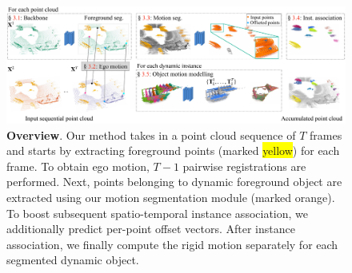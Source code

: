 \begin{figure}[t!]
     \centering
        \includegraphics[width=1.0\columnwidth]{figs/figure/overview.pdf}
        \caption{\textbf{Overview}. Our method takes in a point cloud sequence of $T$ frames and starts by extracting foreground points (marked {\setlength{\fboxsep}{0pt}\colorbox{yellow}{yellow}}) for each frame. To obtain ego motion, $T-1$ pairwise registrations are performed. %
       Next, points belonging to dynamic foreground object are extracted using our motion segmentation module (marked {\setlength{\fboxsep}{0pt}\colorbox{tab10orange}{orange}}).
       To boost subsequent spatio-temporal instance association, we additionally predict per-point offset vectors. After instance association, we finally compute the rigid motion separately for each segmented dynamic object.}
        \label{fig:architecture}
\end{figure}